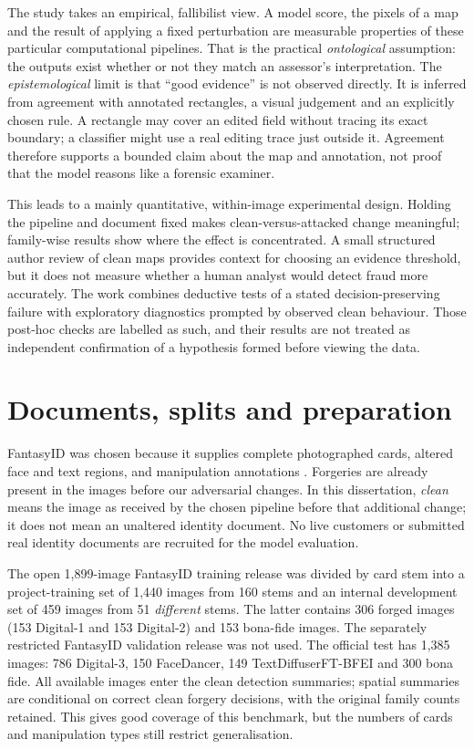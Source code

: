 The study takes an empirical, fallibilist view. A model score, the pixels of a map and the result of applying a fixed perturbation are measurable properties of these particular computational pipelines. That is the practical \emph{ontological} assumption: the outputs exist whether or not they match an assessor's interpretation. The \emph{epistemological} limit is that ``good evidence'' is not observed directly. It is inferred from agreement with annotated rectangles, a visual judgement and an explicitly chosen rule. A rectangle may cover an edited field without tracing its exact boundary; a classifier might use a real editing trace just outside it. Agreement therefore supports a bounded claim about the map and annotation, not proof that the model reasons like a forensic examiner.

This leads to a mainly quantitative, within-image experimental design. Holding the pipeline and document fixed makes clean-versus-attacked change meaningful; family-wise results show where the effect is concentrated. A small structured author review of clean maps provides context for choosing an evidence threshold, but it does not measure whether a human analyst would detect fraud more accurately. The work combines deductive tests of a stated decision-preserving failure with exploratory diagnostics prompted by observed clean behaviour. Those post-hoc checks are labelled as such, and their results are not treated as independent confirmation of a hypothesis formed before viewing the data.

\section{Documents, splits and preparation}
\label{sec:method-data}

FantasyID was chosen because it supplies complete photographed cards, altered face and text regions, and manipulation annotations \citep{korshunov2025fantasyid}. Forgeries are already present in the images before our adversarial changes. In this dissertation, \emph{clean} means the image as received by the chosen pipeline before that additional change; it does not mean an unaltered identity document. No live customers or submitted real identity documents are recruited for the model evaluation.

The open 1,899-image FantasyID training release was divided by card stem into a project-training set of 1,440 images from 160 stems and an internal development set of 459 images from 51 \emph{different} stems. The latter contains 306 forged images (153 Digital-1 and 153 Digital-2) and 153 bona-fide images. The separately restricted FantasyID validation release was not used. The official test has 1,385 images: 786 Digital-3, 150 FaceDancer, 149 TextDiffuserFT-BFEI and 300 bona fide. All available images enter the clean detection summaries; spatial summaries are conditional on correct clean forgery decisions, with the original family counts retained. This gives good coverage of this benchmark, but the numbers of cards and manipulation types still restrict generalisation.


